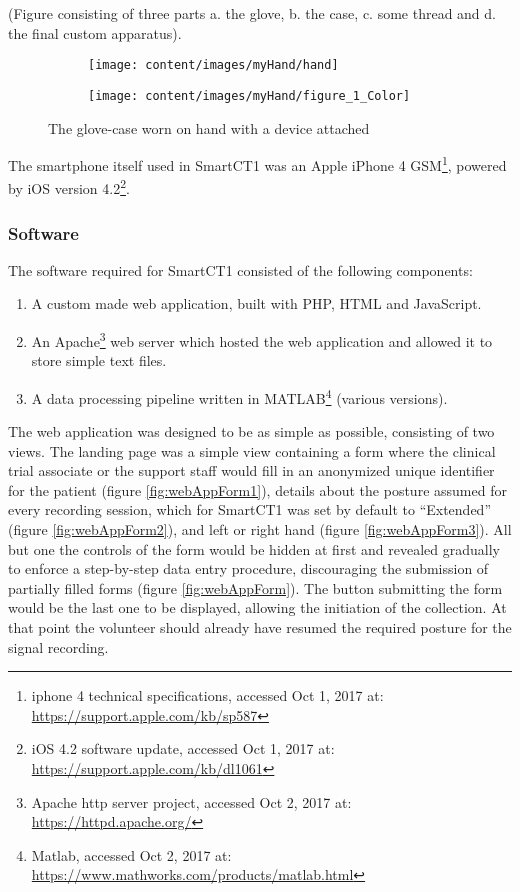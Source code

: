 (\textcolor{BurntOrange}{Figure consisting of three parts a. the glove, b. the case, c. some thread and d. the final custom apparatus}).

\begin{figure}[h]
\centering
\begin{subfigure}{.5\textwidth}
  \centering
  \texttt{[image: content/images/myHand/hand]}
\end{subfigure}%
\begin{subfigure}{.5\textwidth}
  \centering
  \texttt{[image: content/images/myHand/figure\_1\_Color]}
\end{subfigure}
\caption{The glove-case worn on hand with a device attached}
\label{fig:glovCase}
\end{figure}

The smartphone itself used in \gls{SmartCT1} was an Apple iPhone 4 GSM\footnote{iphone 4 technical specifications, accessed Oct 1, 2017 at: \url{https://support.apple.com/kb/sp587}}, powered by iOS version 4.2\footnote{iOS 4.2 software update, accessed Oct 1, 2017 at: \url{https://support.apple.com/kb/dl1061}}. 

\subsubsection{Software}
\label{subsubsec:smartCT1Software}
The software required for \gls{SmartCT1} consisted of the following components:

\begin{enumerate}
\item A custom made web application, built with PHP, HTML and JavaScript.
\item An Apache\footnote{Apache http server project, accessed Oct 2, 2017 at: \url{https://httpd.apache.org/}} web server which hosted the web application and allowed it to store simple text files.
\item A data processing pipeline written in MATLAB\footnote{Matlab, accessed Oct 2, 2017 at: \url{https://www.mathworks.com/products/matlab.html}} (various versions).
\end{enumerate}

The web application was designed to be as simple as possible, consisting of two views. The landing page was a simple view containing a form where the clinical trial associate or the support staff would fill in an anonymized unique identifier for the patient (figure \ref{fig:webAppForm1}), details about the posture assumed for every recording session, which for \gls{SmartCT1} was set by default to ``Extended'' (figure \ref{fig:webAppForm2}), and left or right hand (figure \ref{fig:webAppForm3}). All but one the controls of the form would be hidden at first and revealed gradually to enforce a step-by-step data entry procedure, discouraging the submission of partially filled forms (figure \ref{fig:webAppForm}). The button submitting the form would be the last one to be displayed, allowing the initiation of the collection. At that point the volunteer should already have resumed the required posture for the signal recording. 

